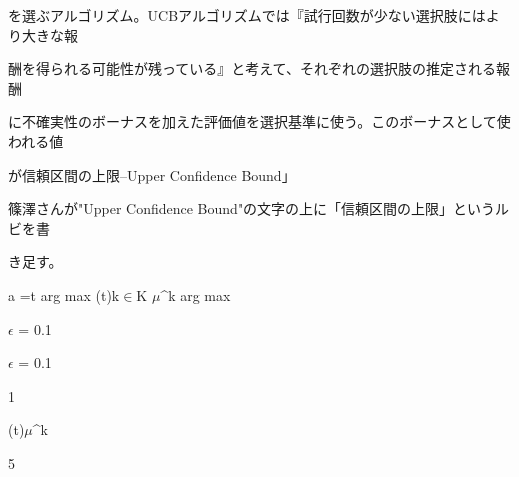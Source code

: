 を選ぶアルゴリズム。UCBアルゴリズムでは『試⾏回数が少ない選択肢にはより⼤きな報\par
酬を得られる可能性が残っている』と考えて、それぞれの選択肢の推定される報酬\par
に不確実性のボーナスを加えた評価値を選択基準に使う。このボーナスとして使われる値\par
が信頼区間の上限--Upper Conﬁdence Bound」\par
篠澤さんが"Upper Conﬁdence Bound"の⽂字の上に「信頼区間の上限」というルビを書\par
き⾜す。\par
a  =t arg max    (t)k$\in$K $\mu$\textasciicircum{}k arg max\par
$\epsilon$ = 0.1\par
$\epsilon$ = 0.1\par
1\par
(t)$\mu$\textasciicircum{}k\par
5\par

